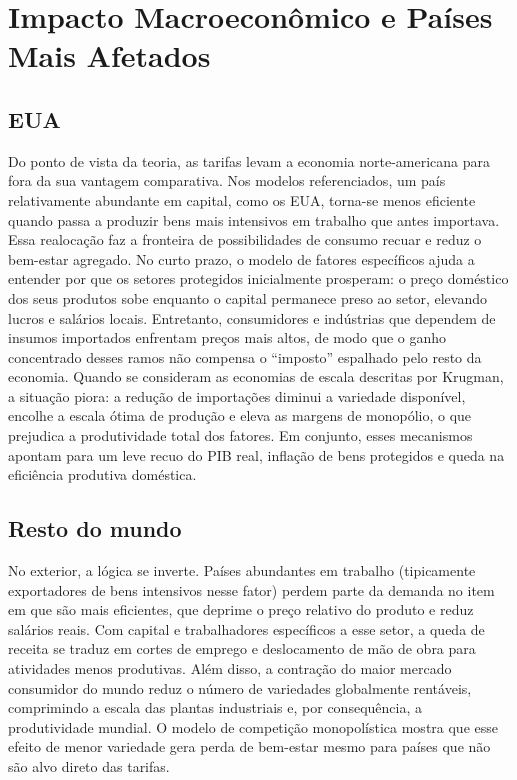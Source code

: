 \documentclass[a4paper,12pt]{article}[abntex2]
\begin{document}
\section*{\textbf{Impacto Macroeconômico e Países Mais Afetados}}

\subsection*{\textbf{EUA}}


Do ponto de vista da teoria, as tarifas levam a economia norte-americana para fora da sua vantagem comparativa. Nos modelos referenciados, um país relativamente abundante em capital, como os EUA, torna-se menos eficiente quando passa a produzir bens mais intensivos em trabalho que antes importava. Essa realocação faz a fronteira de possibilidades de consumo recuar e reduz o bem-estar agregado. No curto prazo, o modelo de fatores específicos ajuda a entender por que os setores protegidos inicialmente prosperam: o preço doméstico dos seus produtos sobe enquanto o capital permanece preso ao setor, elevando lucros e salários locais. Entretanto, consumidores e indústrias que dependem de insumos importados enfrentam preços mais altos, de modo que o ganho concentrado desses ramos não compensa o “imposto” espalhado pelo resto da economia. Quando se consideram as economias de escala descritas por Krugman, a situação piora: a redução de importações diminui a variedade disponível, encolhe a escala ótima de produção e eleva as margens de monopólio, o que prejudica a produtividade total dos fatores. Em conjunto, esses mecanismos apontam para um leve recuo do PIB real, inflação de bens protegidos e queda na eficiência produtiva doméstica.

\subsection*{\textbf{Resto do mundo}}


No exterior, a lógica se inverte. Países abundantes em trabalho (tipicamente exportadores de bens intensivos nesse fator) perdem parte da demanda no item em que são mais eficientes, que deprime o preço relativo do produto e reduz salários reais. Com capital e trabalhadores específicos a esse setor, a queda de receita se traduz em cortes de emprego e deslocamento de mão de obra para atividades menos produtivas. Além disso, a contração do maior mercado consumidor do mundo reduz o número de variedades globalmente rentáveis, comprimindo a escala das plantas industriais e, por consequência, a produtividade mundial. O modelo de competição monopolística mostra que esse efeito de menor variedade gera perda de bem-estar mesmo para países que não são alvo direto das tarifas.
\end{document}
